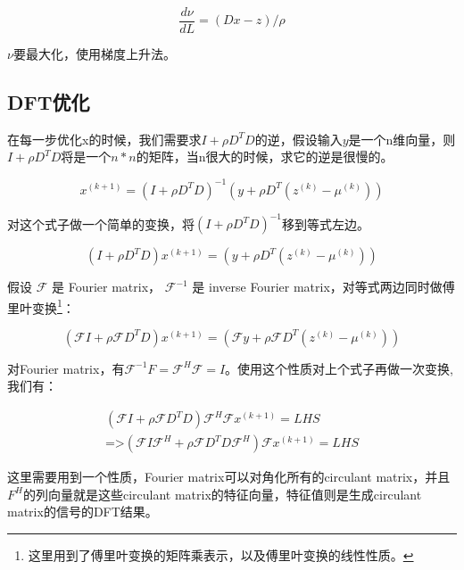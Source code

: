 \documentclass[10pt]{report}
\begin{document}
\begin{equation}
\frac{d\nu}{dL} = (Dx-z)/\rho
\end{equation}

$\nu$要最大化，使用梯度上升法。

\subsection{DFT优化}

在每一步优化x的时候，我们需要求$I +\rho D^TD$的逆，假设输入$y$是一个n维向量，则$I +\rho D^TD$将是一个$n*n$的矩阵，当n很大的时候，求它的逆是很慢的。

\begin{equation}
x ^{(k+1)} =\left( I +\rho D^TD \right)^{-1}\left( y +\rho D^T\left( z ^{(k)}- \mu ^{(k)}\right)\right)
\end{equation}

对这个式子做一个简单的变换，将$\left( I +\rho D^TD \right)^{-1}$移到等式左边。

\begin{equation}
\left( I +\rho D^TD \right) x ^{(k+1)} = \left( y + \rho  D^T\left( z ^{(k)}- \mu ^{(k)}\right) \right)
\end{equation}

假设 $\mathcal{F}$ 是 Fourier matrix， $\mathcal{F}^{-1}$ 是 inverse Fourier matrix，对等式两边同时做傅里叶变换\footnote{这里用到了傅里叶变换的矩阵乘表示，以及傅里叶变换的线性性质。}：

\begin{equation}
\left( \mathcal{F}I +\rho \mathcal{F}D^TD \right) x ^{(k+1)} = \left( \mathcal{F}y + \rho \mathcal{F}D^T\left( z ^{(k)}- \mu ^{(k)}\right) \right)
\end{equation}

对Fourier matrix，有$\mathcal{F}^{-1}F = \mathcal{F}^H\mathcal{F} = I$。使用这个性质对上个式子再做一次变换, 我们有：

\begin{equation}
\begin{aligned}
\left( \mathcal{F}I +\rho\mathcal{F}D^TD  \right) \mathcal{F}^H\mathcal{F} x ^{(k+1)} = LHS \\
\text{=>} 
\left( \mathcal{F}I\mathcal{F}^H +\rho\mathcal{F}D^TD\mathcal{F}^H \right) \mathcal{F} x ^{(k+1)} = LHS	
\end{aligned}
\end{equation}

这里需要用到一个性质，Fourier matrix可以对角化所有的circulant matrix，并且$F^H$的列向量就是这些circulant matrix的特征向量，特征值则是生成circulant matrix的信号的DFT结果。
\end{document}
